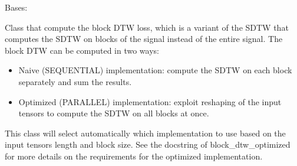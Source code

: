 \documentclass[letterpaper,10pt,english]{sphinxmanual}
\begin{document}
\begin{fulllineitems}
\label{\detokenize{dtw_loss_functions.block_dtw:dtw_loss_functions.block_dtw.block_dtw}}
\pysigstartsignatures
\pysiglinewithargsret
{}
{\sphinxparamcomma {}\sphinxparamcomma {}\sphinxparamcomma {}\sphinxparamcomma {}\sphinxparamcomma {}\sphinxparamcomma {}\sphinxparamcomma {}}
{}
\pysigstopsignatures
\sphinxAtStartPar
Bases: 

\sphinxAtStartPar
Class that compute the block DTW loss, which is a variant of the SDTW that computes the SDTW on blocks of the signal instead of the entire signal.
The block DTW can be computed in two ways:
\begin{itemize}
\item {} 
\sphinxAtStartPar
Naive (SEQUENTIAL) implementation: compute the SDTW on each block separately and sum the results.

\item {} 
\sphinxAtStartPar
Optimized (PARALLEL) implementation: exploit reshaping of the input tensors to compute the SDTW on all blocks at once.

\end{itemize}

\sphinxAtStartPar
This class will select automatically which implementation to use based on the input tensors length and block size.
See the docstring of block\_dtw\_optimized for more details on the requirements for the optimized implementation.


\end{fulllineitems}
\end{document}
